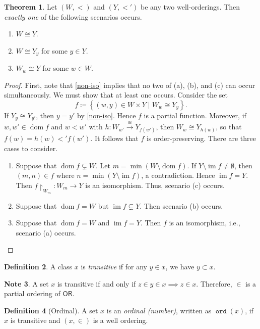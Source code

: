 \documentclass[10pt,letterpaper,cm]{nupset}
\theoremstyle{definition}
\newtheorem{definition}{Definition}[subsection]
\newtheorem{note}[definition]{Note}
\theoremstyle{theorem}
\newtheorem{theorem}[definition]{Theorem}
\theoremstyle{remark}
\newcommand{\1}{\mathbf{1}}
\newcommand{\0}{\vec 0}
\newcommand{\ord}{\mathsf{OR}}
\DeclareMathOperator{\im}{im}
\DeclareMathOperator{\dom}{dom}
\DeclareMathOperator{\od}{\mathtt{ord}}
\begin{document}
\begin{theorem}
Let $\left(W, <\right)$ and $\left(Y, <'\right)$ be any two well-orderings.  Then \emph{exactly one} of the following scenarios occurs. 
\begin{enumerate}[label=(\alph*)]
\item $W \cong Y$.
\item $W \cong  Y_y$ for some $y\in Y$.
\item $W_w \cong Y$ for some $w\in W$.
\end{enumerate}
\end{theorem}
\begin{proof}
First, note that \cref{non-iso} implies that no two of (a), (b), and (c) can occur simultaneously. We must show that at least one occurs. Consider the set $$ f \coloneqq \left\{(w,y) \in W\times Y \mid W_w \cong Y_y\right\}  .$$ If $Y_y \cong Y_{y'}$, then $y = y'$ by \cref{non-iso}. Hence $f$ is a partial function. Moreover,  if $w,w'\in \dom{f}$ and $w<w'$ with $h : W_{w'} \overset{\cong}{\longrightarrow} Y_{f(w')}$, then $W_w \cong Y_{h(w)}$, so that $f(w) = h(w)<' f(w')$. It follows that $f$ is order-preserving. 
There are three cases to consider.
\begin{enumerate}[label=(\roman*)]
\item Suppose that $\dom{f} \subsetneq W$. Let $m = \min(W \setminus \dom{f})$. If $Y \setminus \im{f} \ne \emptyset$, then $\left(m, n\right) \in f$ where $n = \min(Y \setminus \im{f})$, a contradiction. Hence $\im{f} = Y$. Then $f\restriction_{W_m} : W_m \to Y$ is an isomorphism. Thus, scenario (c) occurs.
\item Suppose that $\dom{f} = W$ but $\im{f} \subsetneq Y$. Then scenario (b) occurs.
\item Suppose that $\dom{f} = W$ and $\im{f} = Y$. Then $f$ is an isomorphism, i.e., scenario (a) occurs.
\end{enumerate}
\end{proof}

\begin{definition}
A class $x$ is \textit{transitive} if for any $y\in x$, we have $y\subset x$.
\end{definition}

\begin{note}
A set $x$ is transitive if and only if $z \in y \in x \implies z\in x$. Therefore, $\in$ is a partial ordering of $\ord$.
\end{note}

\begin{definition}[Ordinal]
A set $x$ is an \textit{ordinal (number)}, written as $\od(x)$, if $x$ is transitive and $\left(x, \in\right)$ is a well ordering. 
\end{definition}
\end{document}
